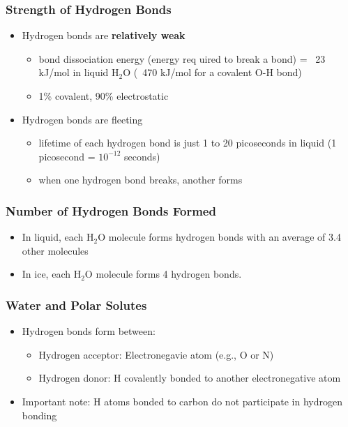 \documentclass[10pt]{article}
\begin{document}
\subsubsection*{Strength of Hydrogen Bonds}
\begin{itemize}
    \item Hydrogen bonds are \textbf{relatively weak}
    \begin{itemize}
        \item bond dissociation energy (energy req  uired to break a bond) = ~23 kJ/mol in liquid H$_2$O (~470 kJ/mol for a covalent O-H bond)
        \item 1\% covalent, 90\% electrostatic
    \end{itemize}
    \item Hydrogen bonds are fleeting
    \begin{itemize}
        \item lifetime of each hydrogen bond is just 1 to 20 picoseconds in liquid (1 picosecond = $10^{-12}$ seconds)
        \item when one hydrogen bond breaks, another forms
    \end{itemize}
\end{itemize}
\subsubsection*{Number of Hydrogen Bonds Formed}
\begin{itemize}
    \item In liquid, each H$_2$O molecule forms hydrogen bonds with an average of 3.4 other molecules
    \item In ice, each H$_2$O molecule forms 4 hydrogen bonds.
\end{itemize}
\subsubsection*{Water and Polar Solutes}
\begin{itemize}
    \item Hydrogen bonds form between:
    \begin{itemize}
        \item Hydrogen acceptor: Electronegavie atom (e.g., O or N)
        \item Hydrogen donor: H covalently bonded to another electronegative atom
    \end{itemize}
    \item Important note: H atoms bonded to carbon do not participate in hydrogen bonding
\end{itemize}
\end{document}
